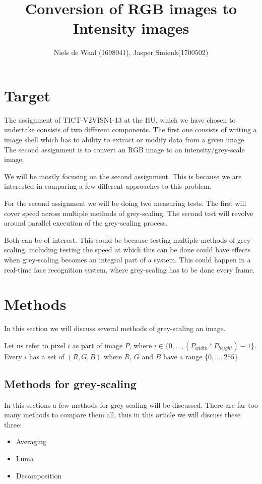 \documentclass[a4paper]{article}
\begin{document}
\title{Conversion of RGB images to Intensity images}
\author{Niels de Waal (1698041), Jasper Smienk(1700502)}
\maketitle
\newpage

\tableofcontents
\newpage

\section{Target}
The assignment of TICT-V2VISN1-13 at the HU, which we have chosen to undertake consists of two different components.
The first one consists of writing a image shell which has to ability to extract or modify data from a given image.
The second assignment is to convert an RGB image to an intensity/grey-scale image. 

We will be mostly focusing on the second assignment. This is because we are interested in comparing a few different approaches to this problem.

For the second assignment we will be doing two measuring tests. The first will cover speed across multiple methods of grey-scaling. The second test will revolve around parallel execution of the grey-scaling process.

Both can be of interest. This could be because testing multiple methods of grey-scaling, including testing the speed at which this can be done could have effects when grey-scaling becomes an integral part of a system. This could happen in a real-time face recognition system, where grey-scaling has to be done every frame.

\section{Methods}
In this section we will discuss several methods of grey-scaling an image.

Let us refer to pixel \(i\) as part of image \(P\), where \(i \in \{0, \dotsc , \left( P_{width} * P_{height} \right) - 1 \} \). Every \(i\) has a set of \( \left(R, G, B \right) \) where \(R\), \(G\) and \(B\) have a range \(\{0, \dotsc ,255 \} \).

\subsection{Methods for grey-scaling}
In this sections a few methods for grey-scaling will be discussed.
There are far too many methods to compare them all, thus in this article we will discuss these three:
\begin{itemize}
\item Averaging
\item Luma
\item Decomposition
\end{itemize}
\end{document}
